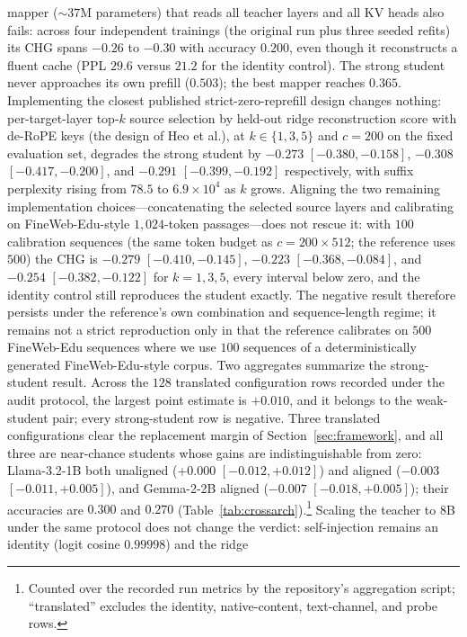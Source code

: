 \documentclass{article} %
\begin{document}
mapper ($\sim$$37$M parameters) that reads all teacher layers and all KV heads
also fails: across four independent trainings (the original run plus three
seeded refits) its CHG spans $-0.26$ to $-0.30$ with accuracy $0.200$, even
though it reconstructs a fluent cache (PPL $29.6$
versus $21.2$ for the identity control). The strong student never
approaches its own prefill ($0.503$); the best mapper reaches $0.365$.
Implementing the closest published strict-zero-reprefill design changes nothing:
per-target-layer top-$k$ source selection by held-out ridge reconstruction score
with de-RoPE keys (the design of Heo et al.), at $k\in\{1,3,5\}$ and $c{=}200$
on the fixed evaluation set, degrades the strong student by $-0.273$
$[-0.380,-0.158]$, $-0.308$ $[-0.417,-0.200]$, and $-0.291$
$[-0.399,-0.192]$ respectively, with suffix perplexity rising from $78.5$ to
$6.9\times10^{4}$ as $k$ grows. Aligning the two remaining implementation choices---concatenating the selected source layers and calibrating on FineWeb-Edu-style $1{,}024$-token passages---does not rescue it: with $100$ calibration sequences (the same token budget as $c{=}200\times512$; the reference uses $500$) the CHG is $-0.279$ $[-0.410,-0.145]$, $-0.223$ $[-0.368,-0.084]$, and $-0.254$ $[-0.382,-0.122]$ for $k{=}1,3,5$, every interval below zero, and the identity control still reproduces the student exactly. The negative result therefore persists under the reference's own combination and sequence-length regime; it remains not a strict reproduction only in that the reference calibrates on $500$ FineWeb-Edu sequences where we use $100$ sequences of a deterministically generated FineWeb-Edu-style corpus. Two
aggregates summarize the strong-student result. Across the $128$ translated configuration
rows recorded under the audit protocol, the largest point estimate is $+0.010$,
and it belongs to the weak-student pair; every strong-student row is negative.
Three translated configurations clear the replacement margin of
Section~\ref{sec:framework}, and all three are near-chance students whose gains
are indistinguishable from zero: Llama-3.2-1B both unaligned ($+0.000$
$[-0.012, +0.012]$) and aligned ($-0.003$ $[-0.011, +0.005]$), and Gemma-2-2B
aligned ($-0.007$ $[-0.018, +0.005]$); their accuracies are $0.300$ and $0.270$
(Table~\ref{tab:crossarch}).\footnote{Counted over the recorded run metrics by the repository's
aggregation script; ``translated'' excludes the identity, native-content,
text-channel, and probe rows.} Scaling
the teacher to 8B under the same protocol does not change the verdict:
self-injection remains an identity (logit cosine $0.99998$) and the ridge
$$
\end{document}
